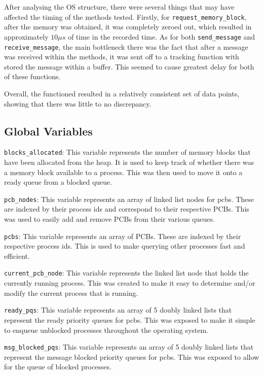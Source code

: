 \documentclass[se]{uw-wkrpt}
\begin{document}
After analysing the OS structure, there were several things that may have affected the timing of the methods tested. Firstly, for \texttt{request\_memory\_block}, after the memory was obtained, it was completely zeroed out, which resulted in approximately $10\mu s$ of time in the recorded time. As for both \texttt{send\_message} and \texttt{receive\_message}, the main bottleneck there was the fact that after a message was received within the methods, it was sent off to a tracking function with stored the message within a buffer. This seemed to cause greatest delay for both of these functions.

Overall, the functioned resulted in a relatively consistent set of data points, showing that there was little to no discrepancy.

\appendix
\begin{appendices}

\section{Global Variables}

\texttt{blocks\_allocated}: This variable represents the number of memory blocks that have been allocated from the heap. It is used to keep track of whether there was a memory block available to a process. This was then used to move it onto a ready queue from a blocked queue.

\texttt{pcb\_nodes}: This variable represents an array of linked list nodes for pcbs. These are indexed by their process ids and correspond to their respective PCBs. This was used to easily add and remove PCBs from their various queues.

\texttt{pcbs}: This variable represents an array of PCBs. These are indexed by their respective process ids. This is used to make querying other processes fast and efficient.

\texttt{current\_pcb\_node}: This variable represents the linked list node that holds the currently running process. This was created to make it easy to determine and/or modify the current process that is running.

\texttt{ready\_pqs}: This variable represents an array of 5 doubly linked lists that represent the ready priority queues for pcbs. This was exposed to make it simple to enqueue unblocked processes throughout the operating system.

\texttt{msg\_blocked\_pqs}: This variable represents an array of 5 doubly linked lists that represent the message blocked priority queues for pcbs. This was exposed to allow for the queue of blocked processes.


\end{appendices}
\end{document}
